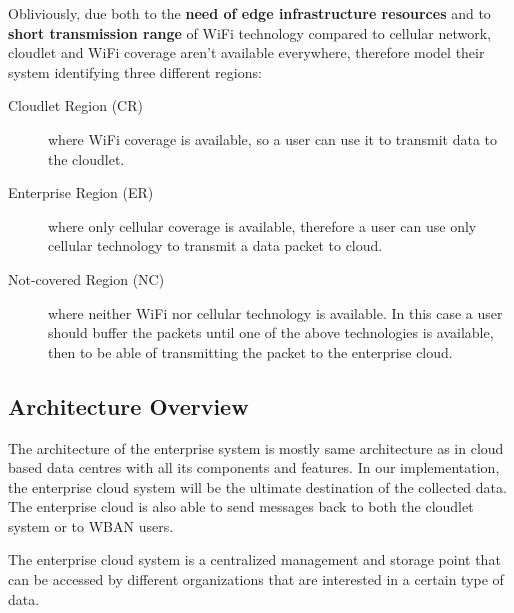 \documentclass[sigchi]{acmart}
\begin{document}
\vspace{0.3cm}

Obliviously, due both to the \textbf{need of edge infrastructure resources} and to \textbf{short transmission range} of WiFi technology compared to cellular network, cloudlet and WiFi coverage aren't available everywhere, therefore \citet{MSAReport} model their system identifying three different regions:\cite[par.~3.1]{MSAReport} 

\begin{description}

\item[Cloudlet Region (CR)] where WiFi coverage is available, so a user can use it to transmit data to the cloudlet.

\item[Enterprise Region (ER)] where only cellular coverage is available, therefore  a user can use only cellular technology to transmit a data packet to cloud. 

\item[Not-covered Region (NC)] where neither WiFi nor cellular technology is available. In this case a user should buffer the packets until one of the above technologies is available, then to be able of transmitting the packet to the enterprise cloud. 

\end{description}

\subsection{Architecture Overview}

\vspace{0.3cm}

\begin{quoting}[font=itshape, begintext={``}, endtext={''\cite[par.~3.2]{MSAReport}}]

The architecture of the enterprise system is mostly same architecture as in cloud based data centres with all its components and features. In our implementation, the enterprise cloud system will be the ultimate destination of the collected data. The enterprise cloud is also able to send messages back to both the cloudlet system or to WBAN users.

\end{quoting}

\vspace{0.3cm}

\begin{quoting}[font=itshape, begintext={``}, endtext={''\cite[par.~4.1]{MSAReport}}]

The enterprise cloud system is a centralized management and storage point that can be accessed by different organizations that are interested in a certain type of data. 

\end{quoting}
\end{document}
